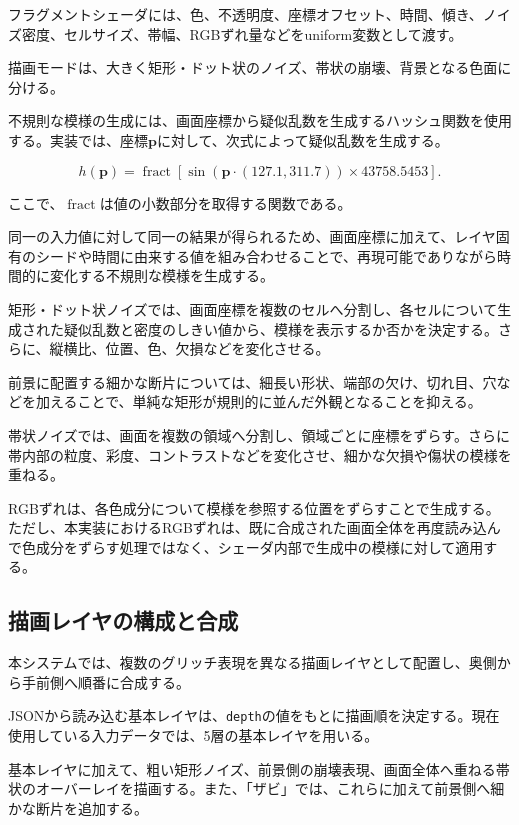 フラグメントシェーダには、色、不透明度、座標オフセット、時間、傾き、ノイズ密度、セルサイズ、帯幅、RGBずれ量などをuniform変数として渡す。

描画モードは、大きく矩形・ドット状のノイズ、帯状の崩壊、背景となる色面に分ける。

不規則な模様の生成には、画面座標から疑似乱数を生成するハッシュ関数を使用する。実装では、座標$\mathbf{p}$に対して、次式によって疑似乱数を生成する。

\begin{equation}
h(\mathbf{p})=
\operatorname{fract}
\left[
\sin\left(
\mathbf{p}\cdot(127.1,311.7)
\right)
\times43758.5453
\right].
\end{equation}

ここで、$\operatorname{fract}$は値の小数部分を取得する関数である。

同一の入力値に対して同一の結果が得られるため、画面座標に加えて、レイヤ固有のシードや時間に由来する値を組み合わせることで、再現可能でありながら時間的に変化する不規則な模様を生成する。

矩形・ドット状ノイズでは、画面座標を複数のセルへ分割し、各セルについて生成された疑似乱数と密度のしきい値から、模様を表示するか否かを決定する。さらに、縦横比、位置、色、欠損などを変化させる。

前景に配置する細かな断片については、細長い形状、端部の欠け、切れ目、穴などを加えることで、単純な矩形が規則的に並んだ外観となることを抑える。

帯状ノイズでは、画面を複数の領域へ分割し、領域ごとに座標をずらす。さらに帯内部の粒度、彩度、コントラストなどを変化させ、細かな欠損や傷状の模様を重ねる。

RGBずれは、各色成分について模様を参照する位置をずらすことで生成する。ただし、本実装におけるRGBずれは、既に合成された画面全体を再度読み込んで色成分をずらす処理ではなく、シェーダ内部で生成中の模様に対して適用する。

\subsection{描画レイヤの構成と合成}

本システムでは、複数のグリッチ表現を異なる描画レイヤとして配置し、奥側から手前側へ順番に合成する。

JSONから読み込む基本レイヤは、\texttt{depth}の値をもとに描画順を決定する。現在使用している入力データでは、5層の基本レイヤを用いる。

基本レイヤに加えて、粗い矩形ノイズ、前景側の崩壊表現、画面全体へ重ねる帯状のオーバーレイを描画する。また、「ザビ」では、これらに加えて前景側へ細かな断片を追加する。

